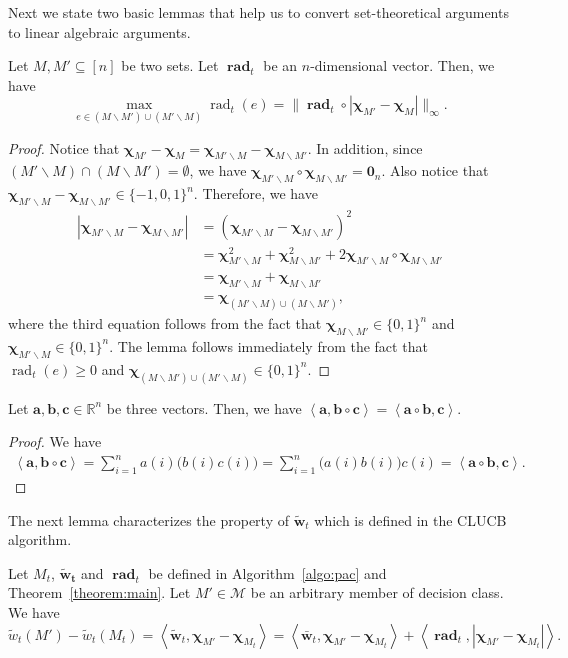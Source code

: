 \documentclass{article}
\newcommand{\Algorithm}{{\small \textsf{CLUCB}}\xspace}
\newcommand{\M}{\mathcal M}
\newcommand{\del}{\backslash}
\newcommand{\RR}{\mathbb R}
\DeclareMathOperator{\rad}{rad}
\newcommand{\inn}[1]{\left\langle #1 \right\rangle}
\renewcommand{\vec}[1]{\boldsymbol{#1}}
\renewcommand{\odot}{\circ}
\begin{document}
Next we state two basic lemmas that help us to convert set-theoretical arguments to linear algebraic arguments.
\begin{lemma}
\label{lemma:max}
Let $M, M' \subseteq [n]$ be two sets. Let $\vec \rad_t$ be an $n$-dimensional vector.
Then, we have 
$$ \max_{e \in (M\del M') \cup (M'\del M)} \rad_t(e) = \big\|\vec \rad_t \odot |\vec \chi_{M'} - \vec \chi_M| \big\|_\infty.$$
\end{lemma}

\begin{proof}
Notice that $\vec\chi_{M'}-\vec\chi_{M} = \vec\chi_{M'\del M}-\vec\chi_{M\del M'}$.
In addition, since $(M'\del M) \cap (M\del M') = \emptyset$, we have
$\vec \chi_{M'\del M} \odot \vec\chi_{M\del M'} = \vec 0_n$. 
Also notice that $ \vec\chi_{M'\del M}-\vec\chi_{M\del M'} \in \{-1,0,1\}^n$.
Therefore, we have
\begin{align*}
|\vec\chi_{M'\del M}-\vec\chi_{M\del M'}| 
&= (\vec\chi_{M'\del M}-\vec\chi_{M\del M'})^2\\
&=\vec\chi_{M'\del M}^2+\vec\chi_{M\del M'}^2+2\vec \chi_{M'\del M} \odot \vec\chi_{M\del M'} \\
&=\vec\chi_{M'\del M}+\vec\chi_{M\del M'}\\
& = \vec\chi_{(M' \del M) \cup (M\del M')},
\end{align*}
where the third equation follows from the fact that $\vec\chi_{M\del M'}\in \{0,1\}^n$ and $\vec\chi_{M'\del M}\in\{0,1\}^n$.
The lemma follows immediately from the fact that $\rad_t(e) \ge 0$ and  $\vec\chi_{(M\del M')\cup(M'\del M)}\in \{0,1\}^n$.
\end{proof}

\begin{lemma}
\label{lemma:vector-technical}
Let $\vec a,\vec b, \vec c \in \RR^n$ be three vectors.
Then, we have $\inn{\vec a, \vec b\odot \vec c} = \inn{\vec a\odot \vec b,\vec c}$.
\end{lemma}

\begin{proof}
We have
\begin{align*}
	\inn{\vec a,\vec b\odot \vec c} = \sum_{i=1}^n a(i) \big(b(i) c(i)\big) = \sum_{i=1}^n \big(a(i)b(i)\big)c(i) = \inn{\vec a\odot\vec b,\vec c}.
\end{align*}
\end{proof}

The next lemma characterizes the property of $\vec{\tilde w}_t$ which is defined in the \Algorithm algorithm.
\begin{lemma}
Let $M_t$, $\vec{\tilde w_t}$ and $\vec\rad_t$ be defined in Algorithm~\ref{algo:pac} and Theorem~\ref{theorem:main}.
Let $M' \in \M$ be an arbitrary member of decision class.
We have
$$
\tilde w_t(M')-\tilde w_t(M_t) = 
\inn{\vec{\tilde w}_t, \vec \chi_{M'}-\vec \chi_{M_t}} = \inn{\vec {\bar w}_t, \vec \chi_{M'}-\vec\chi_{M_t}}+\inn{\vec \rad_t, |\vec \chi_{M'}-\vec\chi_{M_t}|}.
$$
\label{lemma:tilde}
\end{lemma}
\end{document}
